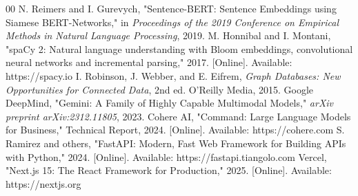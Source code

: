 \documentclass[conference]{IEEEtran}
\begin{document}
\begin{thebibliography}{00}
 N. Reimers and I. Gurevych, "Sentence-BERT: Sentence Embeddings using Siamese BERT-Networks," in \textit{Proceedings of the 2019 Conference on Empirical Methods in Natural Language Processing}, 2019.
 M. Honnibal and I. Montani, "spaCy 2: Natural language understanding with Bloom embeddings, convolutional neural networks and incremental parsing," 2017. [Online]. Available: https://spacy.io
 I. Robinson, J. Webber, and E. Eifrem, \textit{Graph Databases: New Opportunities for Connected Data}, 2nd ed. O'Reilly Media, 2015.
 Google DeepMind, "Gemini: A Family of Highly Capable Multimodal Models," \textit{arXiv preprint arXiv:2312.11805}, 2023.
 Cohere AI, "Command: Large Language Models for Business," Technical Report, 2024. [Online]. Available: https://cohere.com
 S. Ramirez and others, "FastAPI: Modern, Fast Web Framework for Building APIs with Python," 2024. [Online]. Available: https://fastapi.tiangolo.com
 Vercel, "Next.js 15: The React Framework for Production," 2025. [Online]. Available: https://nextjs.org
\end{thebibliography}
\end{document}
